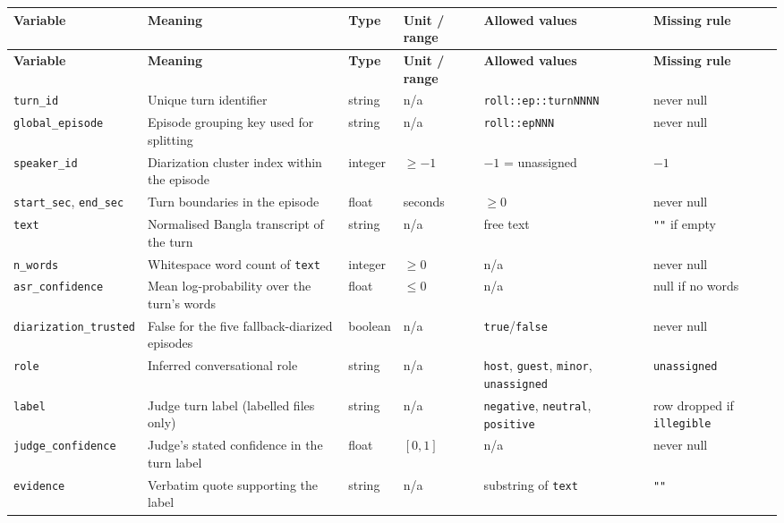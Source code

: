 \documentclass[11pt,a4paper]{article}
\newcommand{\thd}[1]{\textbf{\sffamily\small #1}}          %
\begin{document}
\begingroup\footnotesize
\begin{longtable}{|L{2.6cm}|L{3.5cm}|L{1.6cm}|L{2.1cm}|L{2.8cm}|L{1.9cm}|}
\hline
\thd{Variable} & \thd{Meaning} & \thd{Type} & \thd{Unit / range} & \thd{Allowed values} & \thd{Missing rule} \\ \hline
\endfirsthead
\hline \thd{Variable} & \thd{Meaning} & \thd{Type} & \thd{Unit / range} & \thd{Allowed values} & \thd{Missing rule} \\ \hline \endhead
\texttt{turn\_id}      & Unique turn identifier & string & n/a & \texttt{roll::ep::}\newline\texttt{turnNNNN} & never null \\ \hline
\texttt{global\_episode} & Episode grouping key used for splitting & string & n/a & \texttt{roll::epNNN} & never null \\ \hline
\texttt{speaker\_id}   & Diarization cluster index within the episode & integer & $\ge -1$ & $-1$ = unassigned & $-1$ \\ \hline
\texttt{start\_sec}, \texttt{end\_sec} & Turn boundaries in the episode & float & seconds & $\ge 0$ & never null \\ \hline
\texttt{text}          & Normalised Bangla transcript of the turn & string & n/a & free text & \texttt{""} if empty \\ \hline
\texttt{n\_words}      & Whitespace word count of \texttt{text} & integer & $\ge 0$ & n/a & never null \\ \hline
\texttt{asr\_confidence} & Mean log-probability over the turn's words & float & $\le 0$ & n/a & null if no words \\ \hline
\texttt{diarization\_trusted} & False for the five fallback-diarized episodes & boolean & n/a & \texttt{true}/\texttt{false} & never null \\ \hline
\texttt{role}          & Inferred conversational role & string & n/a & \texttt{host}, \texttt{guest}, \texttt{minor}, \texttt{unassigned} & \texttt{unassigned} \\ \hline
\texttt{label}         & Judge turn label (labelled files only) & string & n/a & \texttt{negative}, \texttt{neutral}, \texttt{positive} & row dropped if \texttt{illegible} \\ \hline
\texttt{judge\_confidence} & Judge's stated confidence in the turn label & float & $[0,1]$ & n/a & never null \\ \hline
\texttt{evidence}      & Verbatim quote supporting the label & string & n/a & substring of \texttt{text} & \texttt{""} \\ \hline
\end{longtable}
\addtocounter{table}{-1}
\endgroup
\end{document}
